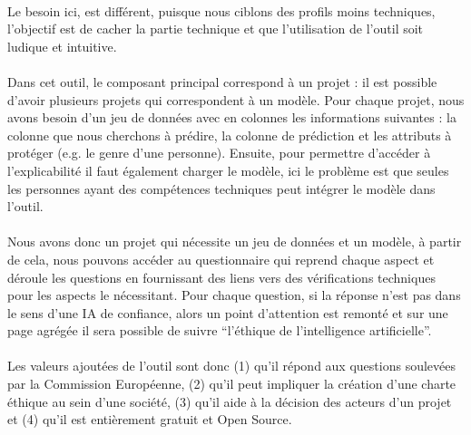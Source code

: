 \documentclass[10pt, french, a4paper]{report}
\begin{document}
\paragraph{}
Le besoin ici, est différent, puisque nous ciblons des profils moins techniques, l'objectif est de cacher la partie technique et que l'utilisation de l'outil soit ludique et intuitive. 

\paragraph{}
Dans cet outil, le composant principal correspond à un projet : il est possible d'avoir plusieurs projets qui correspondent à un modèle. Pour chaque projet, nous avons besoin d'un jeu de données avec en colonnes les informations suivantes : la colonne que nous cherchons à prédire, la colonne de prédiction et les attributs à protéger (e.g. le genre d'une personne). Ensuite, pour permettre d'accéder à l'explicabilité il faut également charger le modèle, ici le problème est que seules les personnes ayant des compétences techniques peut intégrer le modèle dans l'outil.

\paragraph{}
Nous avons donc un projet qui nécessite un jeu de données et un modèle, à partir de cela, nous pouvons accéder au questionnaire qui reprend chaque aspect et déroule les questions en fournissant des liens vers des vérifications techniques pour les aspects le nécessitant. Pour chaque question, si la réponse n'est pas dans le sens d'une IA de confiance, alors un point d'attention est remonté et sur une page agrégée il sera possible de suivre ``l'éthique de l'intelligence artificielle''.

\paragraph{}
Les valeurs ajoutées de l'outil sont donc (1) qu'il répond aux questions soulevées par la Commission Européenne, (2) qu'il peut impliquer la création d'une charte éthique au sein d'une société, (3) qu'il aide à la décision des acteurs d'un projet et (4) qu'il est entièrement gratuit et Open Source.
\end{document}
